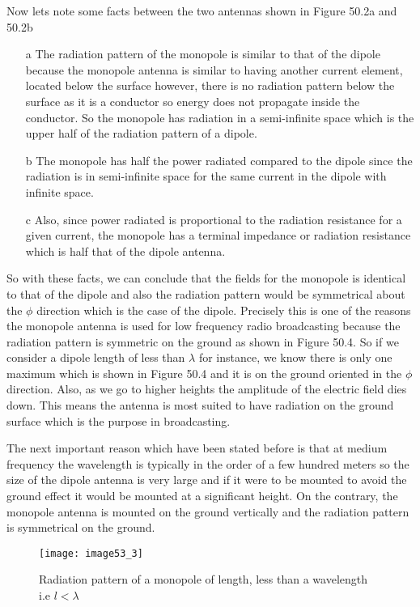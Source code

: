 Now lets note some facts between the two antennas shown in Figure 50.2a and 50.2b
\begin{enumerate}
	\item[a] The radiation pattern of the monopole is similar to that of the dipole because the monopole antenna is similar to having another current element, located below the surface however, there is no radiation pattern below the surface as it is a conductor so energy does not propagate inside the conductor. So the monopole has radiation in a semi-infinite space which is the upper half of the radiation pattern of a dipole.
	\item[b] The monopole has half the power radiated compared to the dipole since the radiation is in semi-infinite space for the same current in the dipole with infinite space.
	\item[c] Also, since power radiated is proportional to the radiation resistance for a given current, the monopole has a terminal impedance or radiation resistance which is half that of the dipole antenna.
\end{enumerate}
So with these facts, we can conclude that the fields for the monopole is identical to that of the dipole and also the radiation pattern would be symmetrical about the $\phi$ direction which is the case of the dipole. Precisely this is one of the reasons the monopole antenna is used for low frequency radio broadcasting because the radiation pattern is symmetric on the ground as shown in Figure 50.4. So if we consider a dipole length of less than $\lambda$ for instance, we know there is only one maximum which is shown in Figure 50.4 and it is on the ground oriented in the $\phi$ direction. Also, as we go to higher heights the amplitude of the electric field dies down. This means the antenna is most suited to have radiation on the ground surface which is the purpose in broadcasting.

The next important reason which have been stated before is that at medium frequency the wavelength is typically in the order of a few hundred meters so the size of the dipole antenna is very large and if it were to be mounted to avoid the ground effect it would be mounted at a significant height. On the contrary, the monopole antenna is mounted on the ground vertically and the radiation pattern is symmetrical on the ground.
\begin{figure}
	\centering
	\texttt{[image: image53\_3]}
	\caption{Radiation pattern of a monopole of length, less than a wavelength i.e $l < \lambda$}
	\label{fig:fig3}
\end{figure}

